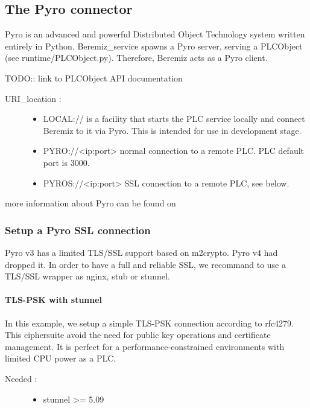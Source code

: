 \documentclass[letterpaper,10pt,english]{sphinxmanual}
\begin{document}
\subsection{The Pyro connector}
\label{\detokenize{manual/connectors:the-pyro-connector}}
Pyro is an advanced and powerful Distributed Object Technology system written entirely in Python.
Beremiz\_service spawns a Pyro server, serving a PLCObject (see runtime/PLCObject.py). Therefore, Beremiz acts as a Pyro client.

TODO:: link to PLCObject API documentation
\begin{description}
\item[{URI\_location :}] \leavevmode\begin{itemize}
\item {} 
LOCAL:// is a facility that starts the PLC service locally and connect Beremiz to it via Pyro.
This is intended for use in development stage.

\item {} 
PYRO://\textless{}ip:port\textgreater{} normal connection to a remote PLC. PLC default port is 3000.

\item {} 
PYROS://\textless{}ip:port\textgreater{} SSL connection to a remote PLC, see below.

\end{itemize}

\end{description}

more information about Pyro can be found on 


\subsubsection{Setup a Pyro SSL connection}
\label{\detokenize{manual/connectors:setup-a-pyro-ssl-connection}}
Pyro v3 has a limited TLS/SSL support based on m2crypto. Pyro v4 had dropped it.
In order to have a full and reliable SSL, we recommand to use a TLS/SSL wrapper as nginx, stub or stunnel.


\paragraph{TLS-PSK with stunnel}
\label{\detokenize{manual/connectors:tls-psk-with-stunnel}}
In this example, we setup a simple TLS-PSK connection according to rfc4279.
This ciphersuite avoid the need for public key operations and certificate management.
It is perfect for a performance-constrained environments with limited CPU power as a PLC.
\begin{description}
\item[{Needed :}] \leavevmode\begin{itemize}
\item {} 
stunnel \textgreater{}= 5.09

\end{itemize}

\end{description}
\end{document}
